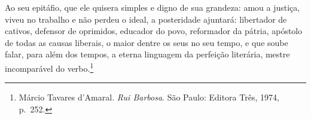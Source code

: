 \begin{hedraquote}
Ao seu epitáfio, que ele quisera simples e digno de sua
grandeza: amou a justiça, viveu no trabalho e não perdeu o ideal, a
posteridade ajuntará: libertador de cativos, defensor de oprimidos,
educador do povo, reformador da pátria, apóstolo de todas as causas
liberais, o maior dentre os seus no seu tempo, e que soube falar, para
além dos tempos, a eterna linguagem da perfeição literária, mestre
incomparável do verbo.\footnote{ Márcio Tavares d'Amaral. \textit{Rui Barbosa}. 
São Paulo: Editora Três, 1974, p.~252.}
\end{hedraquote}

%
%
%
%
%
%
%
%
